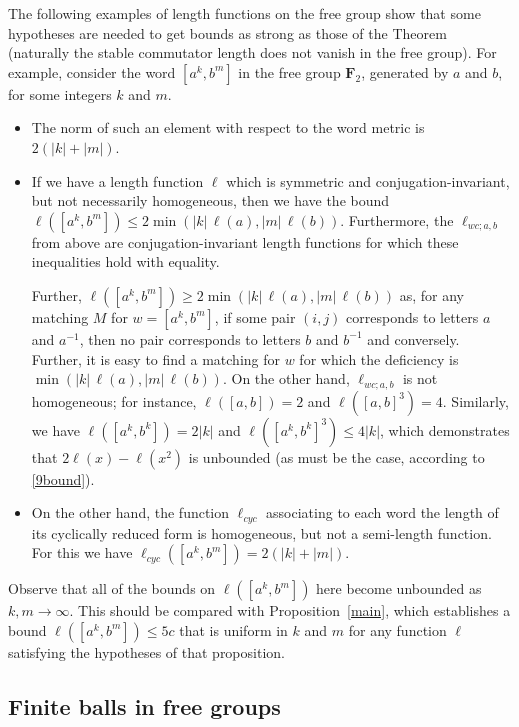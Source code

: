 \documentclass[11pt,a4paper,reqno]{amsart}
\numberwithin{equation}{section}
\theoremstyle{plain}
\theoremstyle{definition}
\newcommand\normsymb{\ell}  %
\newcommand\norm[1]{\ell({#1})}   %
\newcommand\free[1]{\mathbf{F}_{#1}}
\begin{document}
The following examples of length functions on the free group show
that some hypotheses are needed to get bounds as strong as those of the
Theorem (naturally the stable commutator length does not vanish in the
free group).
For example, consider the word $[a^k, b^m]$ in the free group $\free{2}$,
generated by $a$ and $b$, for some integers $k$ and $m$.
\begin{itemize}
\item The norm of such an element with respect  to the word metric is
$2(|k| + |m|)$.

\item If we have a length function $\normsymb$ which is symmetric and
conjugation-invariant, but not necessarily homogeneous, then we have the
bound $\norm{[a^k, b^m]} \leq 2 \min (|k|\, \norm{a}, |m|\, \norm{b})$.
Furthermore, { the $\normsymb_{wc;a,b}$ from above} are conjugation-invariant length
functions for which these inequalities hold with equality.


Further, $\norm{[a^k, b^m]} \geq 2 \min (|k|\, \norm{a}, |m|\, \norm{b})$
as, for any matching $M$ for $w=[a^k, b^m]$, if some pair $(i, j)$
corresponds to letters $a$ and $a^{-1}$, then no pair corresponds to
letters $b$ and $b^{-1}$ and conversely. Further, it is easy to find a
matching for $w$ for which the deficiency is $\min (|k|\, \norm{a}, |m|\,
\norm{b})$.  On the other hand, $\normsymb_{wc;a,b}$ is not homogeneous; for
instance, $\norm{[a,b]} = 2$ and $\norm{[a,b]^3} = 4$.  Similarly, we
have $\norm{[a^k,b^k]}=2|k|$ and $\norm{[a^k,b^k]^3} \leq 4|k|$, which
demonstrates that $2\norm{x} - \norm{x^2}$ is unbounded (as must be the
case, according to \eqref{9bound}).

\item On the other hand, the function $\normsymb_{cyc}$ associating to each
word the length of its cyclically reduced form is homogeneous, but not a
{ { semi-}length function}. For this we have $\normsymb_{cyc}([a^k, b^m]) = 2(|k| +
|m|)$.
\end{itemize}

Observe that all of the bounds on $\norm{[a^k, b^m]}$ here become
unbounded as $k,m \to \infty$.  This should be compared with
{ Proposition~\ref{main}, which establishes a bound
$\norm{[a^k,b^m]} \leq 5c$} that is uniform in $k$ and $m$ for any
function $\normsymb$ satisfying the hypotheses of that proposition.

\subsection{Finite balls in free groups}
\end{document}
